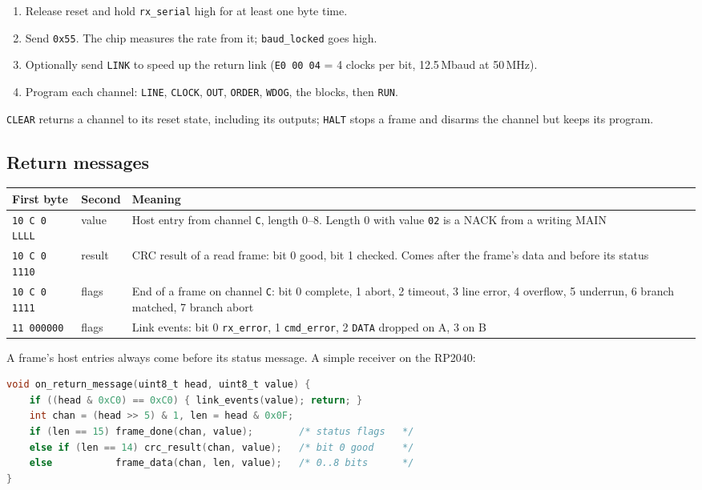 \documentclass[11pt,a4paper]{article}
\newcommand{\sig}[1]{\texttt{#1}}
\begin{document}
\begin{enumerate}
\item Release reset and hold \sig{rx\_serial} high for at least one byte time.
\item Send \texttt{0x55}. The chip measures the rate from it; \sig{baud\_locked} goes high.
\item Optionally send \sig{LINK} to speed up the return link (\texttt{E0 00 04} = 4 clocks per bit, 12.5\,Mbaud at 50\,MHz).
\item Program each channel: \sig{LINE}, \sig{CLOCK}, \sig{OUT}, \sig{ORDER}, \sig{WDOG}, the blocks, then \sig{RUN}.
\end{enumerate}

\sig{CLEAR} returns a channel to its reset state, including its outputs; \sig{HALT} stops a frame and disarms the channel but keeps its program.

\subsection{Return messages}

\begin{center}
\begin{tabularx}{\linewidth}{@{}l l >{\raggedright\arraybackslash}X@{}}
\toprule
First byte & Second & Meaning \\
\midrule
\texttt{10 C 0 LLLL} & value & Host entry from channel \texttt{C}, length 0--8. Length 0 with value \texttt{02} is a NACK from a writing MAIN \\
\texttt{10 C 0 1110} & result & CRC result of a read frame: bit 0 good, bit 1 checked. Comes after the frame's data and before its status \\
\texttt{10 C 0 1111} & flags & End of a frame on channel \texttt{C}: bit 0 complete, 1 abort, 2 timeout, 3 line error, 4 overflow, 5 underrun, 6 branch matched, 7 branch abort \\
\texttt{11 000000} & flags & Link events: bit 0 \sig{rx\_error}, 1 \sig{cmd\_error}, 2 \sig{DATA} dropped on A, 3 on B \\
\bottomrule
\end{tabularx}
\end{center}

A frame's host entries always come before its status message. A simple receiver on the RP2040:

\begin{lstlisting}[language=C]
void on_return_message(uint8_t head, uint8_t value) {
    if ((head & 0xC0) == 0xC0) { link_events(value); return; }
    int chan = (head >> 5) & 1, len = head & 0x0F;
    if (len == 15) frame_done(chan, value);        /* status flags   */
    else if (len == 14) crc_result(chan, value);   /* bit 0 good     */
    else           frame_data(chan, len, value);   /* 0..8 bits      */
}
\end{lstlisting}
\end{document}
